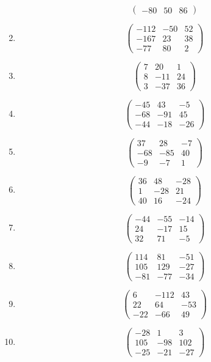 \documentclass{article}%
\begin{document}
\begin{enumerate}[label=\arabic*)]
\[\begin{pmatrix}
-80&50&86%
\end{pmatrix}%
\]%
\item%
\[%
\begin{pmatrix}%
-112&-50&52\\%
-167&23&38\\%
-77&80&2%
\end{pmatrix}%
\]%
\item%
\[%
\begin{pmatrix}%
7&20&1\\%
8&-11&24\\%
3&-37&36%
\end{pmatrix}%
\]%
\item%
\[%
\begin{pmatrix}%
-45&43&-5\\%
-68&-91&45\\%
-44&-18&-26%
\end{pmatrix}%
\]%
\item%
\[%
\begin{pmatrix}%
37&28&-7\\%
-68&-85&40\\%
-9&-7&1%
\end{pmatrix}%
\]%
\item%
\[%
\begin{pmatrix}%
36&48&-28\\%
1&-28&21\\%
40&16&-24%
\end{pmatrix}%
\]%
\item%
\[%
\begin{pmatrix}%
-44&-55&-14\\%
24&-17&15\\%
32&71&-5%
\end{pmatrix}%
\]%
\item%
\[%
\begin{pmatrix}%
114&81&-51\\%
105&129&-27\\%
-81&-77&-34%
\end{pmatrix}%
\]%
\item%
\[%
\begin{pmatrix}%
6&-112&43\\%
22&64&-53\\%
-22&-66&49%
\end{pmatrix}%
\]%
\item%
\[%
\begin{pmatrix}%
-28&1&3\\%
105&-98&102\\%
-25&-21&-27%
\end{pmatrix}%
\]%
\end{enumerate}

%
\end{document}
